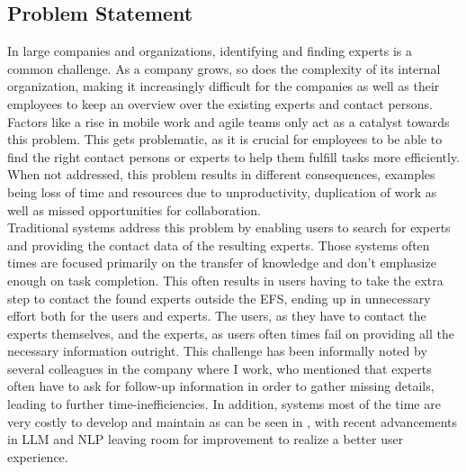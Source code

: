 \subsection{Problem Statement}
In large companies and organizations, identifying and finding experts is a common challenge. As a company grows, so does the complexity of its internal organization, making it increasingly difficult for the companies as well as their employees to keep an overview over the existing experts and contact persons. Factors like a rise in mobile work and agile teams only act as a catalyst towards this problem. This gets problematic, as it is crucial for employees to be able to find the right contact persons or experts to help them fulfill tasks more efficiently. When not addressed, this problem results in different consequences, examples being loss of time and resources due to unproductivity, duplication of work as well as missed opportunities for collaboration. \\
Traditional systems address this problem by enabling users to search for experts and providing the contact data of the resulting experts. Those systems often times are focused primarily on the transfer of knowledge and don't emphasize enough on task completion. This often results in users having to take the extra step to contact the found experts outside the \ac{EFS}, ending up in unnecessary effort both for the users and experts. The users, as they have to contact the experts themselves, and the experts, as users often times fail on providing all the necessary information outright. This challenge has been informally noted by several colleagues in the company where I work, who mentioned that experts often have to ask for follow-up information in order to gather missing details, leading to further time-inefficiencies. In addition, systems most of the time are very costly to develop and maintain as can be seen in \textcite[19-36]{maybury_expert_2006}, with recent advancements in \ac{LLM} and \ac{NLP} leaving room for improvement to realize a better user experience.

